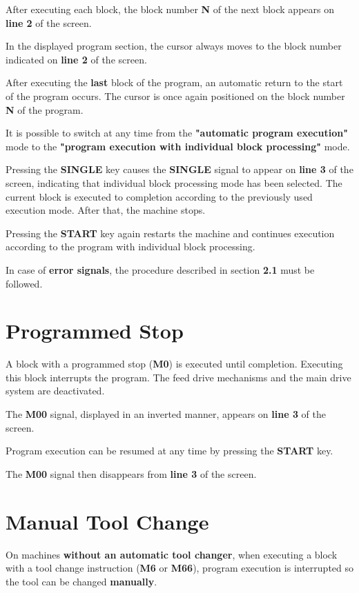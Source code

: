 After executing each block, the block number \textbf{N} of the next block appears on \textbf{line 2} of the screen.

In the displayed program section, the cursor always moves to the block number indicated on \textbf{line 2} of the screen.

After executing the \textbf{last} block of the program, an automatic return to the start of the program occurs.  
The cursor is once again positioned on the block number \textbf{N} of the program.

\notes

It is possible to switch at any time from the \textbf{"automatic program execution"} mode  
to the \textbf{"program execution with individual block processing"} mode.

Pressing the \textbf{SINGLE} key causes the \textbf{SINGLE} signal to appear on \textbf{line 3} of the screen,  
indicating that individual block processing mode has been selected.  
The current block is executed to completion according to the previously used execution mode.  
After that, the machine stops.

Pressing the \textbf{START} key again restarts the machine and continues execution  
according to the program with individual block processing.

In case of \textbf{error signals}, the procedure described in section \textbf{2.1} must be followed.

\section{Programmed Stop}

A block with a programmed stop (\textbf{M0}) is executed until completion.  
Executing this block interrupts the program.  
The feed drive mechanisms and the main drive system are deactivated.

The \textbf{M00} signal, displayed in an inverted manner, appears on \textbf{line 3} of the screen.

Program execution can be resumed at any time by pressing the \textbf{START} key.

The \textbf{M00} signal then disappears from \textbf{line 3} of the screen.
\newpage
\section{Manual Tool Change}

On machines \textbf{without an automatic tool changer}, when executing a block with a tool change instruction (\textbf{M6} or \textbf{M66}),  
program execution is interrupted so the tool can be changed \textbf{manually}.

